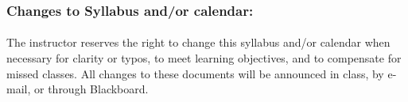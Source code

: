\documentclass{article}
\begin{document}
    \begin{samepage}
      \subsubsection*{Changes to Syllabus and/or calendar:}
      \paragraph*{}
        The instructor reserves the right to change this syllabus and/or calendar when necessary for clarity or typos, to meet learning objectives, and to compensate for missed classes.
  All changes to these documents will be announced in class, by e-mail, or through Blackboard.

    \end{samepage}
\end{document}
